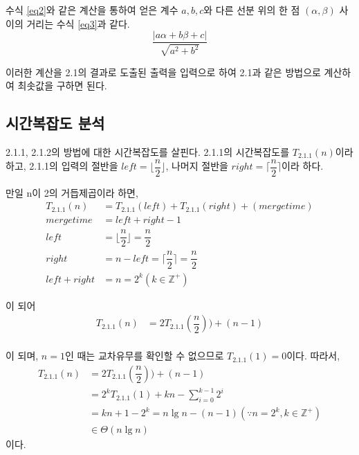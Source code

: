 \documentclass[10pt,a4paper]{article}
\begin{document}
\begin{spacing}{1.6}
	수식 \ref{eq2}와 같은 계산을 통하여 얻은 계수 $a,b,c$와 다른 선분 위의 한 점 $(\alpha,\beta)$ 사이의 거리는 수식 \ref{eq3}과 같다. 
	\begin{equation}
	\frac{|a\alpha+b\beta+c|}{\sqrt{a^2+b^2}}
	\label{eq3}
	\end{equation}

  이러한 계산을 2.1의 결과로 도출된 출력을 입력으로 하여 2.1과 같은 방법으로 계산하여 최솟값을 구하면 된다. 
  
\subsection{시간복잡도 분석}
  2.1.1, 2.1.2의 방법에 대한 시간복잡도를 살핀다. 2.1.1의 시간복잡도를 $T_{2.1.1}(n)$이라 하고, 2.1.1의 입력의 절반을 $left = \lfloor \dfrac{n}{2} \rfloor $, 나머지 절반을 $right = \lceil \dfrac{n}{2} \rceil$이라 하다. 
  
  만일 n이 2의 거듭제곱이라 하면, 
  \begin{equation*}
  \begin{aligned}
  T_{2.1.1}(n) &= T_{2.1.1}(left) + T_{2.1.1}(right) + (mergetime)\\
  mergetime &= left + right -1 \\ 
  left  &= \lfloor \dfrac{n}{2} \rfloor = \dfrac{n}{2} \\
  right &= n - left = \lceil \dfrac{n}{2} \rceil= \dfrac{n}{2} \\
  left + right &= n = 2^k (k \in \mathbb{Z}^{+})
  \end{aligned}
  \end{equation*}
  
  이 되어 
  \begin{equation*}
  \begin{aligned}
  T_{2.1.1}(n) &= 2T_{2.1.1}(\dfrac{n}{2})) + (n-1)\\
  \end{aligned}
  \end{equation*}
  
  이 되며, $n=1$인 때는 교차유무를 확인할 수 없으므로 $T_{2.1.1}(1) = 0$이다. 따라서, 
    \begin{equation*}
  \begin{aligned}
  T_{2.1.1}(n) &= 2T_{2.1.1}(\dfrac{n}{2})) + (n-1)\\
   &= 2^{k}T_{2.1.1}(1) + kn - \sum_{i=0}^{k-1}{2^i} \\
   &= kn+1-2^k = n\lg{n} - (n-1) ( \because n = 2^k ,k \in \mathbb{Z}^{+} )\\
   &\in \Theta(n\lg{n})
  \end{aligned}
  \end{equation*}
  이다. 
  

\end{spacing}
\end{document}
